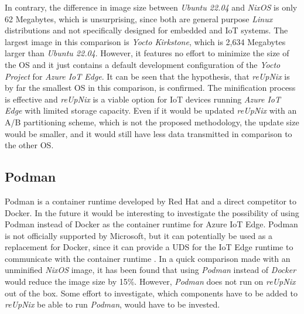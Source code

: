 \noindent
In contrary, the difference in image size between \textit{Ubuntu 22.04} and
\textit{NixOS} is only 62 Megabytes, which is unsurprising, since both are
general purpose \textit{Linux} distributions and not specifically designed
for embedded and \ac{IoT} systems. The largest image in this comparison is
\textit{Yocto Kirkstone}, which is 2,634 Megabytes larger than \textit{Ubuntu 22.04}.
However, it features no effort to minimize the size of the \ac{OS} and it
just contains a default development configuration of the \textit{Yocto Project}
for \textit{Azure IoT Edge}. It can be seen that the hypothesis, that \textit{reUpNix}
is by far the smallest \ac{OS} in this comparison, is confirmed. The minification
process is effective and \textit{reUpNix} is a viable option for \ac{IoT} devices
running \textit{Azure IoT Edge} with limited storage capacity. Even if it would be
updated \textit{reUpNix} with an A/B partitioning scheme, which is not the proposed
methodology, the update size would be smaller, and it would still have less data
transmitted in comparison to the other \ac{OS}.

\subsection{Podman}
Podman is a container runtime developed by Red Hat and a direct competitor to Docker.
In the future it would be interesting to investigate the possibility of using
Podman instead of Docker as the container runtime for Azure IoT Edge. Podman is
not officially supported by Microsoft, but it can potentially be used as a
replacement for Docker, since it can provide a \ac{UDS} for the IoT Edge runtime
to communicate with the container runtime \cite{book:3556946,msdoc-supportetplatforms}.
In a quick comparison made with an unminified \textit{NixOS} image, it has been found that
using \textit{Podman} instead of \textit{Docker} would reduce the image size by
15\%. However, \textit{Podman} does not run on \textit{reUpNix} out of the box.
Some effort to investigate, which components have to be
added to \textit{reUpNix} be able to run \textit{Podman}, would have to be invested.

